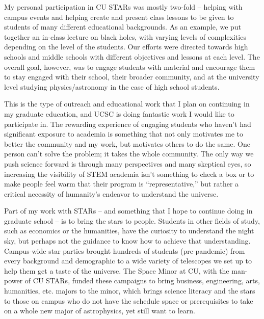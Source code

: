 \documentclass[11pt,letterpaper]{article}
\begin{document}
My personal participation in CU STARs was mostly two-fold -- helping with campus events and helping create and present class lessons to be given to students of many different educational backgrounds. As an example, we put together an in-class lecture on black holes, with varying levels of complexities depending on the level of the students. Our efforts were directed towards high schools and middle schools with different objectives and lessons at each level. The overall goal, however, was to engage students with material and encourage them to stay engaged with their school, their broader community, and at the university level studying physics/astronomy in the case of high school students.

This is the type of outreach and educational work that I plan on continuing in my graduate education, and  UCSC is doing fantastic work I would like to participate in. The rewarding experience of engaging students who haven’t had significant exposure to academia is something that not only motivates me to better the community and my work, but motivates others to do the same. One person can't solve the problem; it takes the whole community. The only way we push science forward is through many perspectives and many skeptical eyes, so increasing the visibility of STEM academia isn’t something to check a box or to make people feel warm that their program is “representative,” but rather a critical necessity of humanity’s endeavor to understand the universe. 

\pagebreak

Part of my work with STARs -- and something that I hope to continue doing in graduate school -- is to bring the stars to people. Students in other fields of study, such as economics or the humanities, have the curiosity to understand the night sky, but perhaps not the guidance to know how to achieve that understanding. Campus-wide star parties brought hundreds of students (pre-pandemic) from every background and demographic to a wide variety of telescopes we set up to help them get a taste of the universe. The Space Minor at CU, with the man-power of CU STARs, funded these campaigns to bring business, engineering, arts, humanities, etc. majors to the minor, which brings science literacy and the stars to those on campus who do not have the schedule space or prerequisites to take on a whole new major of astrophysics, yet still want to learn. 
\end{document}
